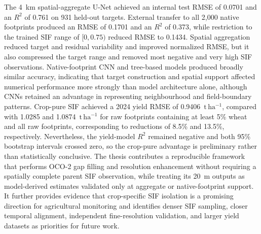 The 4~km spatial-aggregate U-Net achieved an internal test RMSE of 0.0701 and an $R^2$ of 0.761 on 931 held-out targets.
External transfer to all 2,000 native footprints produced an RMSE of 0.1701 and an $R^2$ of 0.373, while restriction to the trained SIF range of $[0,0.75)$ reduced RMSE to 0.1434.
Spatial aggregation reduced target and residual variability and improved normalized RMSE, but it also compressed the target range and removed most negative and very high SIF observations.
Native-footprint CNN and tree-based models produced broadly similar accuracy, indicating that target construction and spatial support affected numerical performance more strongly than model architecture alone, although CNNs retained an advantage in representing neighbourhood and field-boundary patterns.
Crop-pure SIF achieved a 2024 yield RMSE of 0.9406~$\mathrm{t\,ha^{-1}}$, compared with 1.0285 and 1.0874~$\mathrm{t\,ha^{-1}}$ for raw footprints containing at least 5\% wheat and all raw footprints, corresponding to reductions of 8.5\% and 13.5\%, respectively.
Nevertheless, the yield-model $R^2$ remained negative and both 95\% bootstrap intervals crossed zero, so the crop-pure advantage is preliminary rather than statistically conclusive.
The thesis contributes a reproducible framework that performs OCO-2 gap filling and resolution enhancement without requiring a spatially complete parent SIF observation, while treating its 20~m outputs as model-derived estimates validated only at aggregate or native-footprint support.
It further provides evidence that crop-specific SIF isolation is a promising direction for agricultural monitoring and identifies denser SIF sampling, closer temporal alignment, independent fine-resolution validation, and larger yield datasets as priorities for future work.
